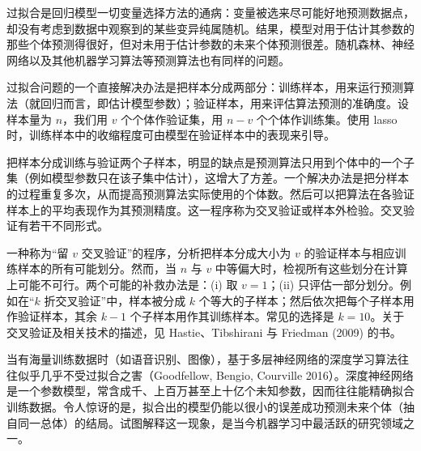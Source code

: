 \begin{figure}[htbp]
\centering
{}
\caption{}
\label{fig:18.2}
\end{figure}

\begin{figure}[htbp]
\centering
{}
\caption{}
\label{fig:18.3}
\end{figure}

\begin{finepoint}[过拟合与交叉验证]
过拟合是回归模型一切变量选择方法的通病：变量被选来尽可能好地预测数据点，却没有考虑到数据中观察到的某些变异纯属随机。结果，模型对用于估计其参数的那些个体预测得很好，但对未用于估计参数的未来个体预测很差。随机森林、神经网络以及其他机器学习算法等预测算法也有同样的问题。

过拟合问题的一个直接解决办法是把样本分成两部分：训练样本，用来运行预测算法（就回归而言，即估计模型参数）；验证样本，用来评估算法预测的准确度。设样本量为 $n$，我们用 $v$ 个个体作验证集，用 $n-v$ 个个体作训练集。使用 lasso 时，训练样本中的收缩程度可由模型在验证样本中的表现来引导。

把样本分成训练与验证两个子样本，明显的缺点是预测算法只用到个体中的一个子集（例如模型参数只在该子集中估计），这增大了方差。一个解决办法是把分样本的过程重复多次，从而提高预测算法实际使用的个体数。然后可以把算法在各验证样本上的平均表现作为其预测精度。这一程序称为交叉验证或样本外检验。交叉验证有若干不同形式。

一种称为“留 $v$ 交叉验证”的程序，分析把样本分成大小为 $v$ 的验证样本与相应训练样本的所有可能划分。然而，当 $n$ 与 $v$ 中等偏大时，检视所有这些划分在计算上可能不可行。两个可能的补救办法是：(i) 取 $v=1$；(ii) 只评估一部分划分。例如在“$k$ 折交叉验证”中，样本被分成 $k$ 个等大的子样本；然后依次把每个子样本用作验证样本，其余 $k-1$ 个子样本用作其训练样本。常见的选择是 $k=10$。关于交叉验证及相关技术的描述，见 Hastie、Tibshirani 与 Friedman (2009) 的书。

当有海量训练数据时（如语音识别、图像），基于多层神经网络的深度学习算法往往似乎几乎不受过拟合之害（Goodfellow, Bengio, Courville 2016）。深度神经网络是一个参数模型，常含成千、上百万甚至上十亿个未知参数，因而往往能精确拟合训练数据。令人惊讶的是，拟合出的模型仍能以很小的误差成功预测未来个体（抽自同一总体）的结局。试图解释这一现象，是当今机器学习中最活跃的研究领域之一。
\end{finepoint}

